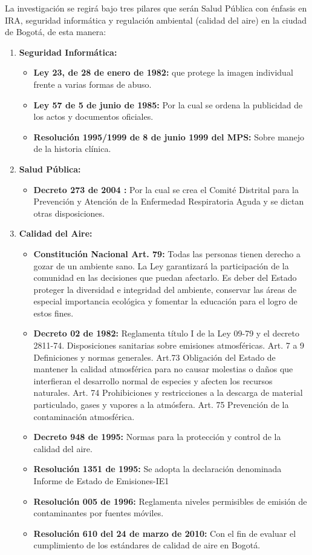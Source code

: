 \documentclass[a4paper, 11pt, oneside]{article}
\theoremstyle{definition}
\theoremstyle{remark}
\begin{document}
La investigación se regirá bajo tres pilares que serán Salud Pública con énfasis en IRA, seguridad informática y regulación ambiental (calidad del aire) en la ciudad de Bogotá, de esta manera:
\begin{enumerate}[I]%
\item\textbf{Seguridad Informática:}
	\begin{itemize}   
	\item\textbf{Ley 23, de 28 de enero de 1982: }que protege la imagen 		     individual frente a varias formas de abuso.
    \item\textbf{Ley 57 de 5 de junio de 1985: } Por la cual se ordena la 			publicidad de los actos y documentos oficiales.
    \item\textbf{Resolución 1995/1999 de 8 de junio 1999 del MPS: } Sobre manejo 	 de la historia clínica.
   
	\end{itemize}
\item\textbf{Salud Pública:}
	\begin{itemize}
	\item\textbf{Decreto 273 de 2004 :} Por la cual se crea el Comité Distrital 	para la Prevención y Atención de la Enfermedad Respiratoria Aguda y se dictan 	  otras disposiciones.
	\end{itemize}
\item\textbf{Calidad del Aire:}
	\begin{itemize}
    \item\textbf{Constitución Nacional Art. 79: }  Todas las personas tienen 		derecho a gozar de un ambiente sano. La Ley garantizará la participación de 	la comunidad en las decisiones que puedan afectarlo. Es deber del Estado 		proteger la diversidad e integridad del ambiente, conservar las áreas de 		especial importancia ecológica y fomentar la educación para el logro de estos 	  fines.
    \item\textbf{Decreto 02 de 1982: } Reglamenta título I de la Ley 09-79 y el        decreto 2811-74. Disposiciones sanitarias sobre emisiones atmosféricas. Art. 	7 a 9 Definiciones y normas generales. Art.73 Obligación del Estado de 			mantener la calidad atmosférica para no causar molestias o daños que 			interfieran el desarrollo normal de especies y afecten los recursos 			naturales. Art. 74 Prohibiciones y restricciones a la descarga de material 		particulado, gases y vapores a la atmósfera. Art. 75 Prevención de la 			contaminación atmosférica.
    \item\textbf{Decreto 948 de 1995: } Normas para la protección y control de la 	   calidad del aire.
    \item\textbf{Resolución 1351 de 1995: } Se adopta la declaración denominada 	 Informe de Estado de Emisiones-IE1
    \item\textbf{Resolución 005 de 1996: } Reglamenta niveles permisibles de 		emisión de contaminantes por fuentes móviles.
    \item\textbf{Resolución 610 del 24 de marzo de 2010: } Con el fin de evaluar 	 el cumplimiento de los estándares de calidad de aire en Bogotá.
\end{itemize}
\end{enumerate}
\clearpage
\end{document}
